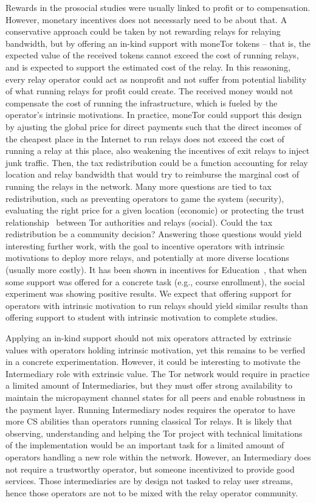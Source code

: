 Rewards in the prosocial studies were usually linked to profit or to
compensation. However, monetary incentives does not necessarly need to be about
that. A conservative approach could be taken by not rewarding relays for
relaying bandwidth, but by offering an in-kind support with moneTor tokens --
that is, the expected value of the received tokens cannot exceed the cost of
running relays, and is expected to support the estimated cost of the relay. In
this reasoning, every relay operator could act as nonprofit and not suffer from
potential liability of what running relays for profit could create. The received
money would not compensate the cost of running the infrastructure, which is
fueled by the operator's intrinsic motivations. In practice, moneTor could
support this design by ajusting the global price for direct payments such that
the direct incomes of the cheapest place in the Internet to run relays does not
exceed the cost of running a relay at this place, also weakening the incentives
of exit relays to inject junk traffic. Then, the tax redistribution could be a
function accounting for relay location and relay bandwidth that would try to
reimburse the marginal cost of running the relays in the network. Many more
questions are tied to tax redistribution, such as preventing operators to game
the system (security), evaluating the right price for a given location
(economic) or protecting the trust relationship~\cite{10.1257/aer.96.5.1611}
between Tor authorities and relays (social). Could the tax redistribution be a
community decision? Answering those questions would yield interesting further
work, with the goal to incentive operators with intrinsic motivations to deploy
more relays, and potentially at more diverse locations (usually more costly). It
has been shown in incentives for Education~\cite{10.1257/jep.25.4.191,
10.1086/431263}, that when some support was offered for a concrete task (e.g.,
course enrollment), the social experiment was showing positive results. We
expect that offering support for operators with intrinsic motivation to run
relays should yield similar results than offering support to student with
intrinsic motivation to complete studies.

Applying an in-kind support should not mix operators attracted by extrinsic
values with operators holding intrinsic motivation, yet this remains to be
verfied in a concrete experimentation. However, it could be interesting to
motivate the Intermediary role with extrinsic value. The Tor network would
require in practice a limited amount of Intermediaries, but they must offer
strong availability to maintain the micropayment channel states for all peers
and enable robustness in the payment layer. Running Intermediary nodes requires
the operator to have more CS abilities than operators running classical Tor
relays. It is likely that observing, understanding and helping the Tor project
with technical limitations of the implementation would be an important task for
a limited amount of operators handling a new role within the network. However,
an Intermediary does not require a trustworthy operator, but someone
incentivized to provide good services. Those intermediaries are by design not
tasked to relay user streams, hence those operators are not to be mixed with the
relay operator community.

